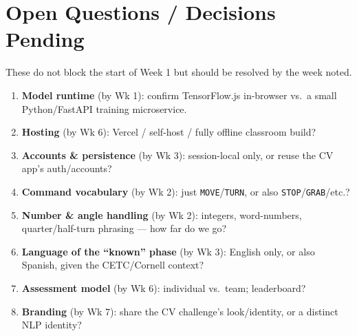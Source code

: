 \documentclass[a4]{article}
\begin{document}
\section{Open Questions / Decisions Pending}\label{sec:open}

These do not block the start of Week 1 but should be resolved by the week noted.

\begin{enumerate}[leftmargin=*, itemsep=1pt]
    \item \textbf{Model runtime} (by Wk 1): confirm TensorFlow.js in-browser vs.\ a
    small Python/FastAPI training microservice.
    \item \textbf{Hosting} (by Wk 6): Vercel / self-host / fully offline classroom
    build?
    \item \textbf{Accounts \& persistence} (by Wk 3): session-local only, or reuse
    the CV app's auth/accounts?
    \item \textbf{Command vocabulary} (by Wk 2): just \texttt{MOVE}/\texttt{TURN},
    or also \texttt{STOP}/\texttt{GRAB}/etc.?
    \item \textbf{Number \& angle handling} (by Wk 2): integers, word-numbers,
    quarter/half-turn phrasing --- how far do we go?
    \item \textbf{Language of the ``known'' phase} (by Wk 3): English only, or also
    Spanish, given the CETC/Cornell context?
    \item \textbf{Assessment model} (by Wk 6): individual vs.\ team; leaderboard?
    \item \textbf{Branding} (by Wk 7): share the CV challenge's look/identity, or a
    distinct NLP identity?
\end{enumerate}
\end{document}
